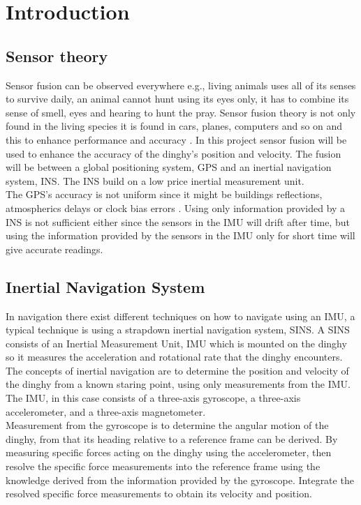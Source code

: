 \newpage
\section{Introduction}
\subsection*{Sensor theory}
Sensor fusion can be observed everywhere e.g., living animals uses all of its senses to survive daily, an animal cannot hunt using its eyes only, it has to combine its sense of smell, eyes and hearing to hunt the pray\cite{animal}. Sensor fusion theory is not only found in the living species it is found in cars, planes, computers and so on and this to enhance performance and accuracy \cite{animal}. In this project sensor fusion will be used to enhance the accuracy of the dinghy's position and velocity. The fusion will be between a global positioning system, GPS and an inertial navigation system, INS. The INS build on a low price inertial measurement unit.\\ 
The GPS's accuracy is not uniform since it might be buildings reflections, atmospherics delays or clock bias errors \cite{boken}. Using only information provided by a INS is not sufficient either since the sensors in the IMU will drift after time, but using the information provided by the sensors in the IMU only for short time will give accurate readings.  

\subsection{Inertial Navigation System}
In navigation there exist different techniques on how to navigate using an IMU, a typical technique is using a strapdown inertial navigation system, SINS. A SINS consists of an Inertial Measurement Unit, IMU which is mounted on the dinghy so it measures the acceleration and rotational rate that the dinghy encounters.
The concepts of inertial navigation are to determine the position and velocity of the dinghy from a known staring point, using only measurements from the IMU. The IMU, in this case consists of a three-axis gyroscope, a three-axis accelerometer, and a three-axis magnetometer. \\
Measurement from the gyroscope is to determine the angular motion of the dinghy, from that its heading relative to a reference frame can be derived.
By measuring specific forces acting on the dinghy using the accelerometer, then resolve the specific force measurements into the reference frame using the knowledge derived from the information provided by the gyroscope. 
Integrate the resolved specific force measurements to obtain its velocity and position. \cite{non-linear} 


